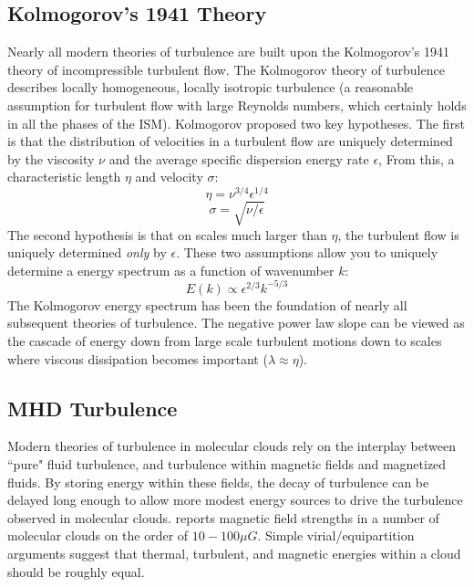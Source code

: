 \documentclass[12pt, preprint]{aastex}
\begin{document}
\subsection{Kolmogorov's 1941 Theory}
Nearly all modern theories of turbulence are built upon the Kolmogorov's 1941
theory of incompressible turbulent flow\citep{kolm1991}.  The Kolmogorov theory of turbulence describes locally
homogeneous, locally isotropic turbulence (a reasonable assumption for turbulent
flow with large Reynolds numbers, which certainly holds in all the phases of the
ISM).  Kolmogorov proposed two key hypotheses. The first is that the distribution 
of velocities in a turbulent flow are uniquely determined by the viscosity 
$\nu$ and the average specific dispersion energy rate $\epsilon$,  From 
this, a characteristic length $\eta$ and velocity $\sigma$:
$$\eta = \nu^{3/4}\epsilon^{1/4}$$
$$\sigma = \sqrt{\nu/\epsilon}$$
The second hypothesis is that on scales much larger than $\eta$, the turbulent flow
is uniquely determined \textit{only} by $\epsilon$.  These two assumptions
allow you to uniquely determine a energy spectrum as a function of wavenumber
$k$:
$$E(k) \propto \epsilon^{2/3}k^{-5/3}$$
The Kolmogorov energy spectrum has been the foundation of nearly all subsequent
theories of turbulence.  The negative power law slope can be viewed as the cascade
of energy down from large scale turbulent motions down to scales where viscous
dissipation becomes important ($\lambda \approx \eta$).
\subsection{MHD Turbulence}
Modern theories of turbulence in molecular clouds rely on the interplay between
``pure" fluid turbulence, and turbulence within magnetic fields and magnetized
fluids.  By storing
energy within these fields, the decay of turbulence can be delayed long enough
to allow more modest energy sources to drive the turbulence observed in
molecular clouds.  \citet{shu1987} reports magnetic field strengths in a number
of molecular clouds on the order of $10-100 \mu G$.  Simple virial/equipartition
arguments suggest that thermal, turbulent, and magnetic energies within a cloud
should be roughly equal.
\end{document}
